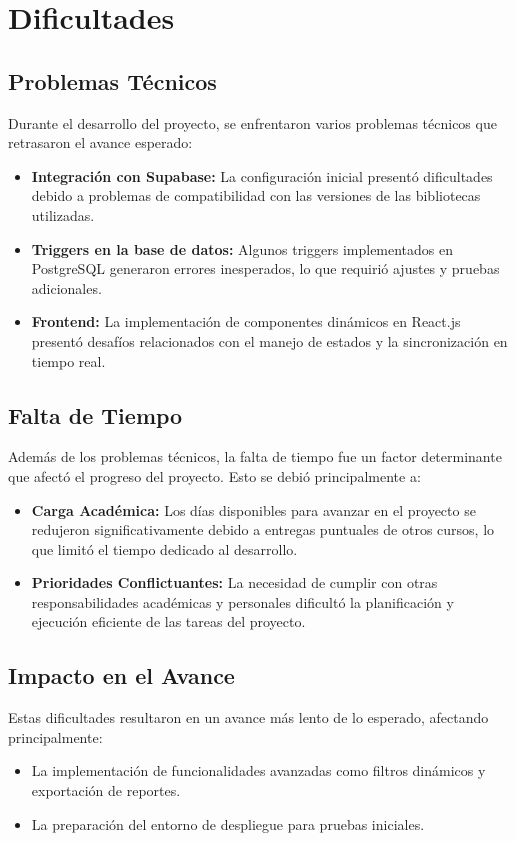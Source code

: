 \section{Dificultades}

\subsection*{Problemas Técnicos}
Durante el desarrollo del proyecto, se enfrentaron varios problemas técnicos que retrasaron el avance esperado:
\begin{itemize}
    \item \textbf{Integración con Supabase:} La configuración inicial presentó dificultades debido a problemas de compatibilidad con las versiones de las bibliotecas utilizadas.
    \item \textbf{Triggers en la base de datos:} Algunos triggers implementados en PostgreSQL generaron errores inesperados, lo que requirió ajustes y pruebas adicionales.
    \item \textbf{Frontend:} La implementación de componentes dinámicos en React.js presentó desafíos relacionados con el manejo de estados y la sincronización en tiempo real.
\end{itemize}

\subsection*{Falta de Tiempo}
Además de los problemas técnicos, la falta de tiempo fue un factor determinante que afectó el progreso del proyecto. Esto se debió principalmente a:
\begin{itemize}
    \item \textbf{Carga Académica:} Los días disponibles para avanzar en el proyecto se redujeron significativamente debido a entregas puntuales de otros cursos, lo que limitó el tiempo dedicado al desarrollo.
    \item \textbf{Prioridades Conflictuantes:} La necesidad de cumplir con otras responsabilidades académicas y personales dificultó la planificación y ejecución eficiente de las tareas del proyecto.
\end{itemize}

\subsection*{Impacto en el Avance}
Estas dificultades resultaron en un avance más lento de lo esperado, afectando principalmente:
\begin{itemize}
    \item La implementación de funcionalidades avanzadas como filtros dinámicos y exportación de reportes.
    \item La preparación del entorno de despliegue para pruebas iniciales.
\end{itemize}

